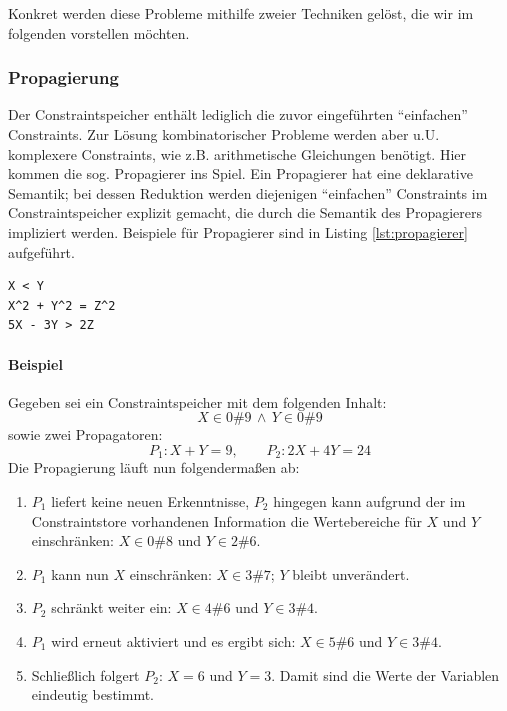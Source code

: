Konkret werden diese Probleme mithilfe zweier Techniken gelöst, die wir im
folgenden vorstellen möchten.

\subsubsection{Propagierung}
Der Constraintspeicher enthält lediglich die zuvor eingeführten "`einfachen"' 
Constraints. Zur Lösung kombinatorischer Probleme werden aber u.U. komplexere 
Constraints, wie z.B. arithmetische Gleichungen benötigt. Hier kommen die sog. 
Propagierer ins Spiel. Ein Propagierer hat eine deklarative Semantik; bei 
dessen Reduktion werden diejenigen "`einfachen"' Constraints im 
Constraintspeicher explizit gemacht, die durch die Semantik des Propagierers 
impliziert werden. Beispiele für Propagierer sind in Listing 
\ref{lst:propagierer} aufgeführt.

\begin{lstlisting}[caption={Beispiele für Propagierer}, label={lst:propagierer}]
X < Y
X^2 + Y^2 = Z^2
5X - 3Y > 2Z
\end{lstlisting}

\paragraph{Beispiel} Gegeben sei ein Constraintspeicher mit dem folgenden 
Inhalt: $$X \in 0\#9 \, \wedge \, Y \in 0\#9$$ sowie zwei Propagatoren: $$P_1: 
X + Y = 9, \qquad P_2: 2X + 4Y = 24$$ Die Propagierung läuft nun folgendermaßen 
ab:

\begin{enumerate}
  \item $P_1$ liefert keine neuen Erkenntnisse, $P_2$ hingegen kann aufgrund der
  im Constraintstore vorhandenen Information die Wertebereiche für $X$ und $Y$
  einschränken: $X \in 0\#8$ und $Y \in 2\#6$.
  \item $P_1$ kann nun $X$ einschränken: $X \in 3\#7$; $Y$ bleibt unverändert. 
  \item $P_2$ schränkt weiter ein: $X \in 4\#6$ und $Y \in 3\#4$.
  \item $P_1$ wird erneut aktiviert und es ergibt sich: $X \in 5\#6$ und $Y \in
  3\#4$.
  \item Schließlich folgert $P_2$: $X = 6$ und $Y = 3$. Damit sind die Werte der
  Variablen eindeutig bestimmt. \cite[Finite Domain Constraint Programming in
  Oz, Chapter 2.3]{url:mozart-documentation}
\end{enumerate}

